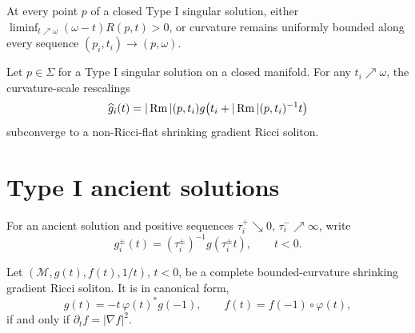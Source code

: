 \begin{corollary}
\label{cor:chow-iv-distinguish-type-i-singular-points}


At every point \(p\) of a closed Type I singular solution, either
\(\liminf_{t\nearrow\omega}(\omega-t)R(p,t)>0\), or curvature remains
uniformly bounded along every sequence \((p_i,t_i)\to(p,\omega)\).
\end{corollary}

\begin{theorem}
\label{thm:chow-iv-singular-point-curvature-scale-limits-nonflat}


Let \(p\in\Sigma\) for a Type I singular solution on a closed manifold.  For
any \(t_i\nearrow\omega\), the curvature-scale rescalings
\[
 \widehat g_i(t)=|\operatorname{Rm}|(p,t_i)
 g\bigl(t_i+|\operatorname{Rm}|(p,t_i)^{-1}t\bigr)
\]
subconverge to a non-Ricci-flat shrinking gradient Ricci soliton.
\end{theorem}

\section{Type I ancient solutions}

For an ancient solution and positive sequences
\(\tau_i^+\searrow0\), \(\tau_i^-\nearrow\infty\), write
\[
 g_i^\pm(t)=(\tau_i^\pm)^{-1}g(\tau_i^\pm t),\qquad t<0.
\]

\begin{lemma}
\label{lem:chow-iv-shrinker-canonical-form-characterization}

Let \((\mathcal M,g(t),f(t),1/t)\), \(t<0\), be a complete
bounded-curvature shrinking gradient Ricci soliton.  It is in canonical form,
\[
 g(t)=-t\,\varphi(t)^*g(-1),\qquad
 f(t)=f(-1)\circ\varphi(t),
\]
if and only if \(\partial_t f=|\nabla f|^2\).
\end{lemma}

